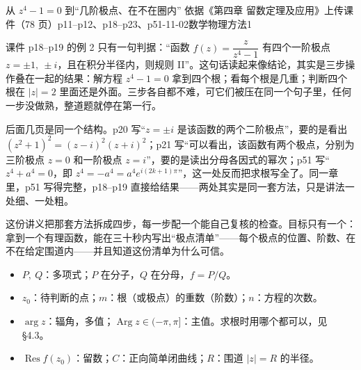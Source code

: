 \documentclass[11pt]{ctexart}
\let\origsubhdr\subhdr
\renewcommand{\subhdr}[1]{\par\needspace{4\baselineskip}\origsubhdr{#1}}
\let\orighdr\hdr
\renewcommand{\hdr}[2]{\par\orighdr{#1}{#2}}
\begin{document}
{从 $z^{4}-1=0$ 到“几阶极点、在不在圈内”}
{依据《第四章 留数定理及应用》上传课件（78 页）p11--p12、p18--p23、p51-11-02\quad 数学物理方法1}


课件 p18--p19 的例 2 只有一句判据：“函数 $f(z)=\dfrac{z}{z^{4}-1}$ 有四个一阶极点 $z=\pm1,\ \pm i$，且在积分半径内，则规则 II”。这句话读起来像结论，其实是三步操作叠在一起的结果：解方程 $z^{4}-1=0$ 拿到四个根；看每个根是几重；判断四个根在 $|z|=2$ 里面还是外面。三步各自都不难，可它们被压在同一个句子里，任何一步没做熟，整道题就停在第一行。

后面几页是同一个结构。p20 写“$z=\pm i$ 是该函数的两个二阶极点”，要的是看出 $(z^{2}+1)^{2}=(z-i)^{2}(z+i)^{2}$；p21 写“可以看出，该函数有两个极点，分别为三阶极点 $z=0$ 和一阶极点 $z=i$”，要的是读出分母各因式的幂次；p51 写“$z^{4}+a^{4}=0$，即 $z^{4}=-a^{4}=a^{4}e^{i(2k+1)\pi}$”，这一处反而把求根写全了。同一章里，p51 写得完整，p18--p19 直接给结果——两处其实是同一套方法，只是讲法一处细、一处粗。

这份讲义把那套方法拆成四步，每一步配一个能自己复核的检查。目标只有一个：拿到一个有理函数，能在三十秒内写出“极点清单”——每个极点的位置、阶数、在不在给定围道内——并且知道这份清单为什么可信。


\begin{itemize}
\item $P,\ Q$：多项式；$P$ 在分子，$Q$ 在分母，$f=P/Q$。
\item $z_0$：待判断的点；$m$：根（或极点）的重数（阶数）；$n$：方程的次数。
\item $\arg z$：辐角，多值；$\operatorname{Arg}z\in(-\pi,\pi]$：主值。求根时用哪个都可以，见 §4.3。
\item $\operatorname{Res}f(z_0)$：留数；$C$：正向简单闭曲线；$R$：围道 $|z|=R$ 的半径。
\end{itemize}





\end{document}
